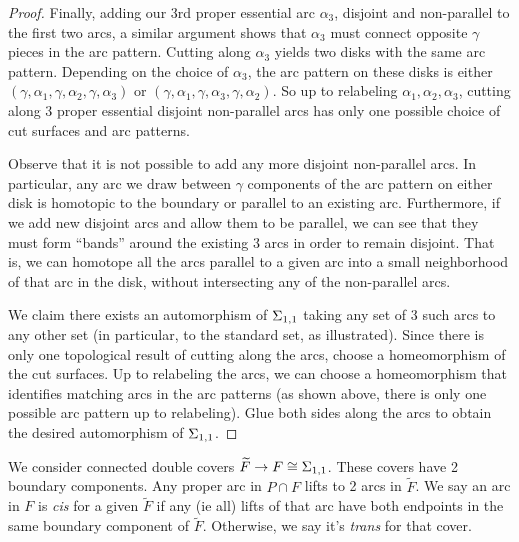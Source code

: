 \begin{proof}
Finally, adding our 3rd proper essential arc $\alpha_3$, disjoint and
non-parallel to the first two arcs, a similar argument shows that $\alpha_3$
must connect opposite $\gamma$ pieces in the arc pattern. Cutting along
$\alpha_3$ yields two disks with the same arc pattern. Depending on the choice
of $\alpha_3$, the arc pattern on these disks is either
$(\gamma,\alpha_1,\gamma,\alpha_2,\gamma,\alpha_3)$ or
$(\gamma,\alpha_1,\gamma,\alpha_3,\gamma,\alpha_2)$. So up to relabeling
$\alpha_1,\alpha_2,\alpha_3$, cutting along 3 proper essential disjoint
non-parallel arcs has only one possible choice of cut surfaces and arc
patterns.

Observe that it is not possible to add any more disjoint non-parallel arcs. In
particular, any arc we draw between $\gamma$ components of the arc pattern on
either disk is homotopic to the boundary or parallel to an existing arc.
Furthermore, if we add new disjoint arcs and allow them to be parallel, we can
see that they must form ``bands'' around the existing 3 arcs in order to remain
disjoint. That is, we can homotope all the arcs parallel to a given arc into
a small neighborhood of that arc in the disk, without intersecting any of the
non-parallel arcs.

We claim there exists an automorphism of $\Sigma_{1,1}$ taking any set of 3 such
arcs to any other set (in particular, to the standard set, as illustrated).
Since there is only one topological result of cutting along the arcs, choose
a homeomorphism of the cut surfaces. Up to relabeling the arcs, we can choose
a homeomorphism that identifies matching arcs in the arc patterns (as shown
above, there is only one possible arc pattern up to relabeling). Glue both
sides along the arcs to obtain the desired automorphism of $\Sigma_{1,1}$.

\end{proof}

We consider connected double covers $\widetilde{F} \to F \cong \Sigma_{1,1}$.
These covers have 2 boundary components. Any proper arc in $P \cap F$ lifts to
2 arcs in $\widetilde{F}$.  We say an arc in $F$ is \emph{cis} for a given
$\widetilde{F}$ if any (ie all) lifts of that arc have both endpoints in the
same boundary component of $\widetilde{F}$.  Otherwise, we say it's
\emph{trans} for that cover.

